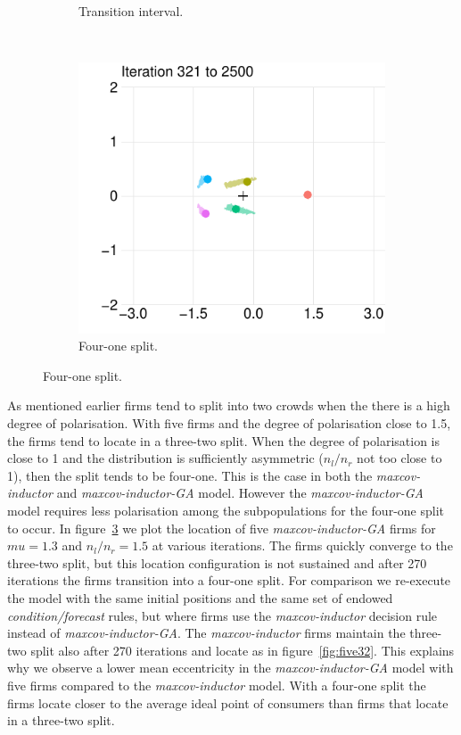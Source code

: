 \documentclass[preprint, 12pt]{elsarticle}
\begin{document}
\begin{figure}[hb!]
\begin{subfigure}[t]{0.315\textwidth}
		\caption{Transition interval.}
		\label{fig:fivetransition}
	\end{subfigure}
	~
	\begin{subfigure}[t]{0.315\textwidth}
		\centering
		\includegraphics[width=\textwidth, trim={6mm 0 2mm 0}]{Graphics/fig6m_miga3.pdf}
		\caption{Four-one split.}
		\label{fig:five41}
	\end{subfigure}
	
	\label{fig:five}
\end{figure}

As mentioned earlier firms tend to split into two crowds when the there is a high degree of polarisation. With five firms and the degree of polarisation close to 1.5, the firms tend to locate in a three-two split. When the degree of polarisation is close to 1 and the distribution is sufficiently asymmetric ($n_l/n_r$ not too close to 1), then the split tends to be four-one. This is the case in both the \emph{maxcov-inductor} and \emph{maxcov-inductor-GA} model. However the \emph{maxcov-inductor-GA} model requires less polarisation among the subpopulations for the four-one split to occur. In figure~\ref{fig:five} we plot the location of five \emph{maxcov-inductor-GA} firms for $mu = 1.3$ and $n_l/n_r = 1.5$ at various iterations. The firms quickly converge to the three-two split, but this location configuration is not sustained and after 270 iterations the firms transition into a four-one split. For comparison we re-execute the model with the same initial positions and the same set of endowed \emph{condition/forecast} rules, but where firms use the \emph{maxcov-inductor} decision rule instead of \emph{maxcov-inductor-GA}. The \emph{maxcov-inductor} firms maintain the three-two split also after 270 iterations and locate as in figure~\ref{fig:five32}. This explains why we observe a lower mean eccentricity in the \emph{maxcov-inductor-GA} model with five firms compared to the \emph{maxcov-inductor} model. With a four-one split the firms locate closer to the average ideal point of consumers than firms that locate in a three-two split.
\end{document}
